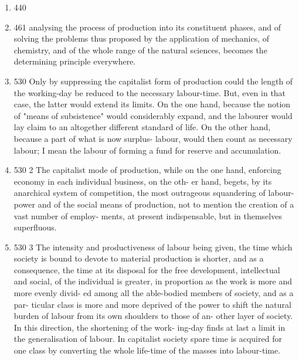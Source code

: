 \documentclass[12pt]{article}
\begin{document}
\begin{enumerate}
	\item 440 
	\item 461 analysing the process of production into its constituent phases,
and of solving the problems thus proposed by the application of
mechanics, of chemistry, and of the whole range of the natural
sciences, becomes the determining principle everywhere. 
	\item 530 Only by suppressing the
capitalist form of production could the length of the working-day
be reduced to the necessary labour-time. But, even in that case,
the latter would extend its limits. On the one hand, because the
notion of "means of subsistence" would considerably expand, and
the labourer would lay claim to an altogether different standard of
life. On the other hand, because a part of what is now surplus-
labour, would then count as necessary labour; I mean the labour
of forming a fund for reserve and accumulation.
	\item 530 2 The capitalist mode of production, while on the
one hand, enforcing economy in each individual business, on the oth-
er hand, begets, by its anarchical system of competition, the most
outrageous squandering of labour-power and of the social means of
production, not to mention the creation of a vast number of employ-
ments, at present indispensable, but in themselves superfluous.
	\item 530 3 The intensity and productiveness of labour being given, the
time which society is bound to devote to material production is shorter, and as a consequence, the time at its disposal for the
free development, intellectual and social, of the individual is
greater, in proportion as the work is more and more evenly divid-
ed among all the able-bodied members of society, and as a par-
ticular class is more and more deprived of the power to shift the
natural burden of labour from its own shoulders to those of an-
other layer of society. In this direction, the shortening of the work-
ing-day finds at last a limit in the generalisation of labour. In
capitalist society spare time is acquired for one class by converting
the whole life-time of the masses into labour-time.
 

\end{enumerate}
\end{document}
